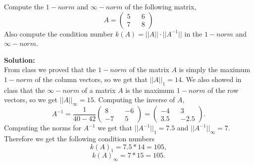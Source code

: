 \documentclass[12pt]{article}
\makeatletter
\theoremstyle{homework}
\newenvironment{exercise}[1]
{\def\@currentlabel{#1}\exercisecore}
{\endexercisecore}
\newcommand{\localhead}[1]{\par\smallskip\noindent\textbf{#1}\nobreak\\}%
\newcommand\solution{\localhead{Solution:}}
\makeatother
\begin{document}
\begin{exercise}{Exercise 7.9} Compute the $1-norm$ and $\infty-norm$ of the following matrix,
  \begin{equation*}
    A  = \begin{pmatrix}
      5 && 6\\
      7 && 8
    \end{pmatrix}
  \end{equation*}
  Also compute the condition number $k(A) = ||A|| \cdot ||A^{-1}||$ in the $1-norm$ and $\infty-norm$.
  \solution From class we proved that the $1-norm$ of the matrix $A$ is simply the maximum $1-norm$ of the column vectors, so we get 
  that $||A||_1 = 14$. We also showed in class that the $\infty-norm$ of a matrix $A$ is the maximum $1-norm$ of the row vectors, so we get
  $||A||_\infty = 15$. Computing the inverse of $A$,
  \begin{equation*}
    A^{-1} = \dfrac{1}{40 - 42}
    \begin{pmatrix}
      8 && -6\\
      -7 && 5
    \end{pmatrix}
     = \begin{pmatrix}
      -4 && 3\\
      3.5 && -2.5
    \end{pmatrix}.
  \end{equation*}
Computing the norms for $A^{-1}$ we get that $||A^{-1}||_{1} = 7.5$ and $||A^{-1}||_{\infty} = 7$. Therefore we get the following condition numbers
\begin{equation*}
  k(A)_1 = 7.5*14 = 105,
\end{equation*}
\begin{equation*}
  k(A)_{\infty} = 7*15 = 105.
\end{equation*}
\end{exercise}
\vspace{.5in}
\end{document}
